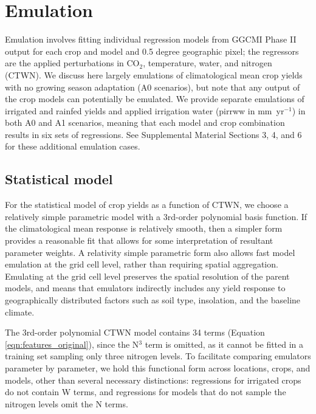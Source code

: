 \documentclass[gmd, manuscript]{copernicus} %
\begin{document}
\section{Emulation}
\label{S:3}
Emulation involves fitting individual regression models from GGCMI Phase II output for each crop and model and 0.5 degree geographic pixel; the regressors are the applied perturbations in CO$_2$, temperature, water, and nitrogen (CTWN). 
We discuss here largely emulations of climatological mean crop yields with no growing season adaptation (A0 scenarios), but note that any output of the crop models can potentially be emulated. 
We provide separate emulations of irrigated and rainfed yields and applied irrigation water (pirrww in mm\ yr$^{-1}$) in both A0 and A1 scenarios, meaning that each model and crop combination results in six sets of regressions. See Supplemental Material Sections 3, 4, and 6 for these additional emulation cases.

\subsection{Statistical model}
For the statistical model of crop yields as a function of CTWN, we choose a relatively simple parametric model with a 3rd-order polynomial basis function. 
If the climatological mean response is relatively smooth, then a simpler form provides a reasonable fit that allows for some interpretation of resultant parameter weights. 
A relativity simple parametric form also allows fast model emulation at the grid cell level, rather than requiring spatial aggregation. 
Emulating at the grid cell level preserves the spatial resolution of the parent models, and means that emulators indirectly includes any yield response to geographically distributed factors such as soil type, insolation, and the baseline climate.

The 3rd-order polynomial CTWN model contains 34 terms (Equation \ref{eqn:features_original}), since the N$^3$ term is omitted, as it cannot be fitted in a training set sampling only three nitrogen levels. 
To facilitate comparing emulators parameter by parameter, we hold this functional form across locations, crops, and models, other than several necessary distinctions: regressions for irrigated crops do not contain W terms, and regressions for models that do not sample the nitrogen levels omit the N terms. 
\end{document}
